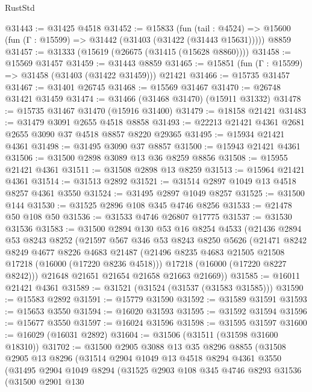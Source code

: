\begin{lexlean}{RustStd}
\begin{coremodule}
@31443 := @31425 @4518
@31452 := @15833
    (fun (tail : @4524) => @15600 (fun (Γ : @15599) => @31442 (@31403 (@31422 (@31443 @15631)))))
    @8859
@31457 := @31333 (@15619 (@26675 (@31415 (@15628 @8860))))
@31458 := @15569 @31457
@31459 := @31443 @8859
@31465 := @15851 (fun (Γ : @15599) => @31458 (@31403 (@31422 @31459))) @21421
@31466 := @15735 @31457
@31467 := @31401 @26745
@31468 := @15569 @31467
@31470 := @26748 @31421 @31459
@31474 := @31466 (@31468 @31470) (@15911 @31332)
@31478 := @15735 @31467 @31470 (@15916 @31400)
@31479 := @18158 @21421
@31483 := @31479 @3091 @2655 @4518 @8858
@31493 := @22213 @21421 @4361 @2681 @2655 @3090 @37 @4518 @8857 @8220 @29365
@31495 := @15934 @21421 @4361
@31498 := @31495 @3090 @37 @8857
@31500 := @15943 @21421 @4361
@31506 := @31500 @2898 @3089 @13 @36 @8259 @8856
@31508 := @15955 @21421 @4361
@31511 := @31508 @2898 @13 @8259
@31513 := @15964 @21421 @4361
@31514 := @31513 @2892
@31521 := @31514 @2897 @1049 @13 @4518 @8257 @4361 @3550
@31524 := @31495 @2897 @1049 @8257
@31525 := @31500 @144
@31530 := @31525 @2896 @108 @345 @4746 @8256
@31533 := @21478 @50 @108 @50
@31536 := @31533 @4746 @26807 @17775
@31537 := @31530 @31536
@31583 := @31500
    @2894
    @130
    @53
    @16
    @8254
    @4533
    (@21436
      @2894
      @53
      @8243
      @8252
      (@21597
        @567
        @346
        @53
        @8243
        @8250
        @5626
        (@21471
          @8242
          @8249
          @4677
          @8226
          @4683
          @21487
          (@21496 @8235 @4683 @21505 @21508 @17218 (@16000 (@17220 @8236 @4518)))
          @17218
          (@16000 (@17220 @8227 @8242)))
        @21648
        @21651
        @21654
        @21658
        @21663
        @21669))
@31585 := @16011 @21421 @4361
@31589 := @31521 (@31524 (@31537 (@31583 @31585)))
@31590 := @15583 @2892
@31591 := @15779 @31590
@31592 := @31589 @31591
@31593 := @15653 @3550
@31594 := @16020 @31593
@31595 := @31592 @31594
@31596 := @15677 @3550
@31597 := @16024 @31596
@31598 := @31595 @31597
@31600 := @16029 (@16031 @2892)
@31604 := @31506 (@31511 (@31598 @31600 @18310))
@31702 := @31500
    @2905
    @3088
    @13
    @35
    @8296
    @8855
    (@31508
      @2905
      @13
      @8296
      (@31514
        @2904
        @1049
        @13
        @4518
        @8294
        @4361
        @3550
        (@31495
          @2904
          @1049
          @8294
          (@31525
            @2903
            @108
            @345
            @4746
            @8293
            @31536
            (@31500
              @2901
              @130

\end{coremodule}
\end{lexlean}
